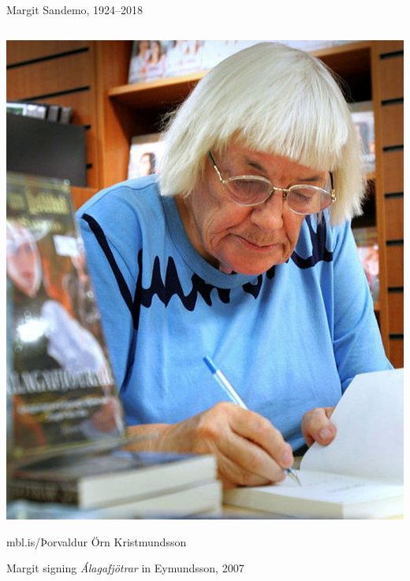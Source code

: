 \begin{frame}{Margit Sandemo, 1924--2018}
\begin{columns}[T]
\begin{column}{0.4\textwidth}
            \includegraphics[width=\textwidth]{../figures/margit_sandemo}
            \begin{tiny}
                mbl.is/Þorvaldur Örn Kristmundsson
            \end{tiny}

            \vfill
            Margit signing \emph{Álagafjötrar} in Eymundsson, 2007
        \end{column}
    \end{columns}
\end{frame}

